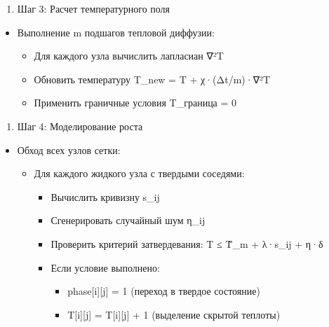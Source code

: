 \documentclass[
  12pt,
  a4paper,
  DIV=11,
  numbers=noendperiod]{scrreprt}
\providecommand{\tightlist}{%
  \setlength{\itemsep}{0pt}\setlength{\parskip}{0pt}}\usepackage{longtable,booktabs,array}
\begin{document}
\begin{enumerate}
\def\labelenumi{\arabic{enumi}.}
\setcounter{enumi}{4}
\tightlist
\item
  Шаг 3: Расчет температурного поля
\end{enumerate}

\begin{itemize}
\tightlist
\item
  Выполнение m подшагов тепловой диффузии:

  \begin{itemize}
  \tightlist
  \item
    Для каждого узла вычислить лапласиан ∇²T
  \item
    Обновить температуру T\_new = T + χ·(Δt/m)·∇²T
  \item
    Применить граничные условия T\_граница = 0
  \end{itemize}
\end{itemize}

\begin{enumerate}
\def\labelenumi{\arabic{enumi}.}
\setcounter{enumi}{5}
\tightlist
\item
  Шаг 4: Моделирование роста
\end{enumerate}

\begin{itemize}
\tightlist
\item
  Обход всех узлов сетки:

  \begin{itemize}
  \tightlist
  \item
    Для каждого жидкого узла с твердыми соседями:

    \begin{itemize}
    \tightlist
    \item
      Вычислить кривизну s\_ij
    \item
      Сгенерировать случайный шум η\_ij
    \item
      Проверить критерий затвердевания: T ≤ T̃\_m + λ·s\_ij + η·δ
    \item
      Если условие выполнено:

      \begin{itemize}
      \tightlist
      \item
        phase{[}i{]}{[}j{]} = 1 (переход в твердое состояние)
      \item
        T{[}i{]}{[}j{]} = T{[}i{]}{[}j{]} + 1 (выделение скрытой
        теплоты)
      \end{itemize}
    \end{itemize}
  \end{itemize}
\end{itemize}
\end{document}
